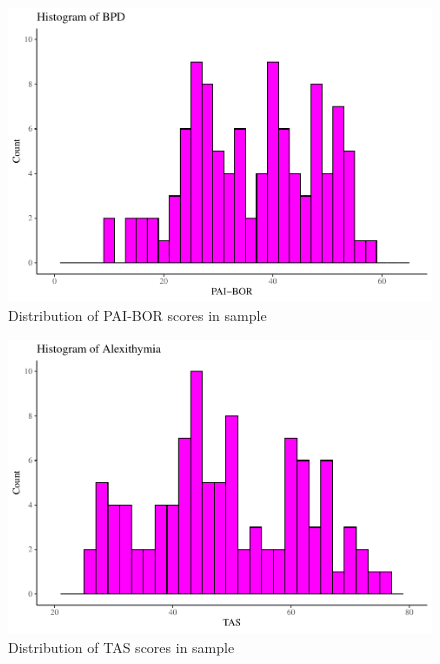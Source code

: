 \documentclass[
  man,floatsintext]{apa7}
\begin{document}
\begin{figure}[H]
\includegraphics[width=0.7\linewidth]{d2m-Psychopathy_files/figure-latex/PAI-descriptives-1} \caption{Distribution of PAI-BOR scores in sample}\label{fig:PAIBOR-descriptives-appendix}
\end{figure}

\begin{figure}[H]
\includegraphics[width=0.7\linewidth]{d2m-Psychopathy_files/figure-latex/TAS-descriptives-1} \caption{Distribution of TAS scores in sample}\label{fig:TAS-descriptives-appendix}
\end{figure}
\end{document}
